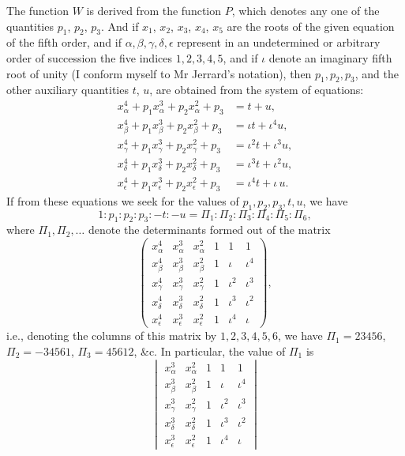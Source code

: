 \documentclass[11pt,a4paper]{article}
\begin{document}
The function $W$ is derived from the function $P$, which denotes any one of the quantities $p_1$, $p_2$, $p_3$. And if $x_1$, $x_2$, $x_3$, $x_4$, $x_5$ are the roots of the given equation of the fifth order, and if $\alpha,\beta,\gamma,\delta,\epsilon$ represent in an undetermined or arbitrary order of succession the five indices $1,2,3,4,5$, and if $\iota$ denote an imaginary fifth root of unity (I conform myself to Mr Jerrard's notation), then $p_1,p_2,p_3$, and the other auxiliary quantities $t$, $u$, are obtained from the system of equations:
\begin{align*}
x_\alpha^4+p_1 x_\alpha^3+p_2 x_\alpha^2+p_3 &= t+u,\\
x_\beta^4+p_1 x_\beta^3+p_2 x_\beta^2+p_3 &= \iota t+\iota^4 u,\\
x_\gamma^4+p_1 x_\gamma^3+p_2 x_\gamma^2+p_3 &= \iota^2 t+\iota^3 u,\\
x_\delta^4+p_1 x_\delta^3+p_2 x_\delta^2+p_3 &= \iota^3 t+\iota^2 u,\\
x_\epsilon^4+p_1 x_\epsilon^3+p_2 x_\epsilon^2+p_3 &= \iota^4 t+\iota\, u.
\end{align*}
If from these equations we seek for the values of $p_1,p_2,p_3,t,u$, we have
\[
1:p_1:p_2:p_3:-t:-u=\Pi_1:\Pi_2:\Pi_3:\Pi_4:\Pi_5:\Pi_6,
\]
where $\Pi_1,\Pi_2,\ldots$ denote the determinants formed out of the matrix
\[
\begin{pmatrix}
x_\alpha^4 & x_\alpha^3 & x_\alpha^2 & 1 & 1 & 1 \\
x_\beta^4 & x_\beta^3 & x_\beta^2 & 1 & \iota & \iota^4 \\
x_\gamma^4 & x_\gamma^3 & x_\gamma^2 & 1 & \iota^2 & \iota^3 \\
x_\delta^4 & x_\delta^3 & x_\delta^2 & 1 & \iota^3 & \iota^2 \\
x_\epsilon^4 & x_\epsilon^3 & x_\epsilon^2 & 1 & \iota^4 & \iota
\end{pmatrix},
\]
i.e., denoting the columns of this matrix by $1,2,3,4,5,6$, we have $\Pi_1=23456$, $\Pi_2=-34561$, $\Pi_3=45612$, \&c. In particular, the value of $\Pi_1$ is
\[
\begin{vmatrix}
x_\alpha^3 & x_\alpha^2 & 1 & 1 & 1 \\
x_\beta^3 & x_\beta^2 & 1 & \iota & \iota^4 \\
x_\gamma^3 & x_\gamma^2 & 1 & \iota^2 & \iota^3 \\
x_\delta^3 & x_\delta^2 & 1 & \iota^3 & \iota^2 \\
x_\epsilon^3 & x_\epsilon^2 & 1 & \iota^4 & \iota
\end{vmatrix}
\]
\end{document}
